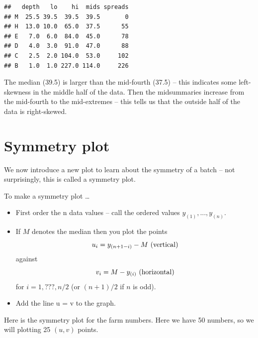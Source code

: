 \documentclass[
]{book}
\newenvironment{Shaded}{\begin{snugshade}}{\end{snugshade}}
\newcommand{\FunctionTok}[1]{\textcolor[rgb]{0.00,0.00,0.00}{#1}}
\newcommand{\NormalTok}[1]{#1}
\newcommand{\SpecialCharTok}[1]{\textcolor[rgb]{0.00,0.00,0.00}{#1}}
\providecommand{\tightlist}{%
  \setlength{\itemsep}{0pt}\setlength{\parskip}{0pt}}
\begin{document}
\begin{Shaded}
\end{Shaded}

\begin{verbatim}
##   depth   lo    hi  mids spreads
## M  25.5 39.5  39.5  39.5       0
## H  13.0 10.0  65.0  37.5      55
## E   7.0  6.0  84.0  45.0      78
## D   4.0  3.0  91.0  47.0      88
## C   2.5  2.0 104.0  53.0     102
## B   1.0  1.0 227.0 114.0     226
\end{verbatim}

The median (39.5) is larger than the mid-fourth (37.5) -- this indicates some left-skewness in the middle half of the data. Then the midsummaries increase from the mid-fourth to the mid-extremes -- this tells us that the outside half of the data is right-skewed.

\hypertarget{symmetry-plot}{%
\section{Symmetry plot}\label{symmetry-plot}}

We now introduce a new plot to learn about the symmetry of a batch -- not surprisingly, this is called a symmetry plot.

To make a symmetry plot \ldots{}

\begin{itemize}
\tightlist
\item
  First order the n data values -- call the ordered values \(y_{(1)}, ..., y_{(n)}\).
\item
  If \(M\) denotes the median then you plot the points
  \[
  u_i = y_{(n+1-i)} - M \, \, ({\rm vertical})
  \]
  against
  \[
  v_i = M - y_{(i)} \, \, ({\rm horizontal})
  \]
  for \(i = 1, ???, n/2\) (or \((n+1)/2\) if \(n\) is odd).
\item
  Add the line u = v to the graph.
\end{itemize}

Here is the symmetry plot for the farm numbers. Here we have 50 numbers, so we will plotting 25 \((u, v)\) points.

\begin{Shaded}
\end{Shaded}
\end{document}

